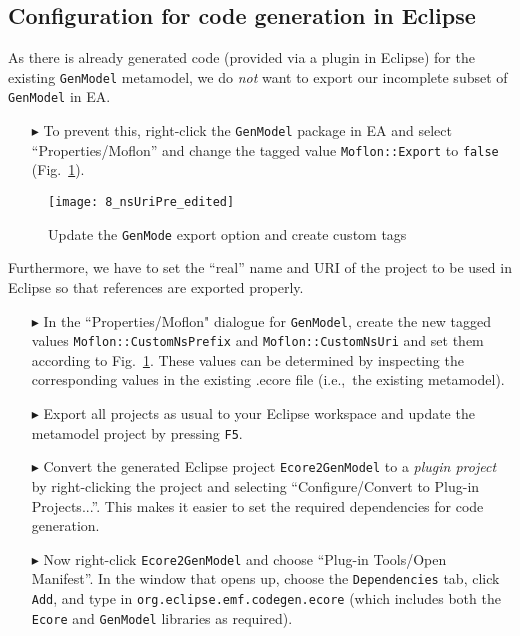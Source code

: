 \newpage

\subsection{Configuration for code generation in Eclipse}
\visHeader

As there is already generated code (provided via a plugin in Eclipse) for the existing \texttt{GenModel} metamodel, we do \emph{not} want to export our
incomplete subset of \texttt{GenModel} in EA.

\begin{enumerate}
\item[$\blacktriangleright$] To prevent this, right-click the \texttt{GenModel} package in EA and select ``Properties/Moflon'' and change the tagged value
\texttt{Moflon::Export} to \texttt{false} (Fig.~\ref{fig_customNS}).
\end{enumerate}

\begin{figure}[htb]
\begin{center}  \texttt{[image: 8\_nsUriPre\_edited]}
  \caption{Update the \texttt{GenMode} export option and create custom tags}  
  \label{fig_customNS}
\end{center}
\end{figure}

Furthermore, we have to set the ``real'' name and URI of the project to be used in Eclipse so that references are exported properly. 

\begin{enumerate}

\item[$\blacktriangleright$] In the ``Properties/Moflon" dialogue for \texttt{GenModel}, create the new tagged values \texttt{Moflon::CustomNsPrefix} and
\texttt{Moflon::CustomNsUri} and set them according to Fig.~\ref{fig_customNS}. These values can be determined by inspecting the corresponding values in the
existing .ecore file (i.e.,~the existing metamodel).

\item[$\blacktriangleright$] Export all projects as usual to your Eclipse workspace and update the metamodel project by pressing \texttt{F5}.

\item[$\blacktriangleright$] Convert the generated Eclipse project \texttt{Ecore2GenModel} to a \emph{plugin project} by right-clicking the project and
selecting ``Configure/Convert to Plug-in Projects...''. This makes it easier to set the required dependencies for code generation.

\item[$\blacktriangleright$] Now right-click \texttt{Ecore2GenModel} and choose ``Plug-in Tools/Open Manifest''. In the window that opens up, choose the
\texttt{Dependencies} tab, click \texttt{Add}, and type in \texttt{org.eclipse.emf.codegen.ecore} (which includes both the \texttt{Ecore} and \texttt{GenModel}
libraries as required).

\end{enumerate}


